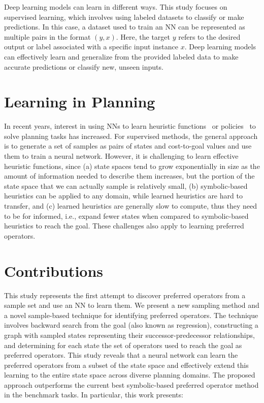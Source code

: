 \documentclass[ppgc,diss,english]{iiufrgs}
\begin{document}
Deep learning models can learn in different ways. This study focuses on supervised learning, which involves using labeled datasets to classify or make predictions. In this case, a dataset used to train an NN can be represented as multiple pairs in the format $(y, x)$. Here, the target $y$ refers to the desired output or label associated with a specific input instance $x$. Deep learning models can effectively learn and generalize from the provided labeled data to make accurate predictions or classify new, unseen inputs.

\section{Learning in Planning}
In recent years, interest in using NNs to learn heuristic functions~\cite{Ferber.etal/2020a,Yu.etal/2020,Shen.etal/2020,Ferber.etal/2022,OToole/2022} or policies~\cite{Toyer.etal/2018,Toyer.etal/2020,Stahlberg.etal/2022} to solve planning tasks has increased. For supervised methods, the general approach is to generate a set of samples as pairs of states and cost-to-goal values and use them to train a neural network. However, it is challenging to learn effective heuristic functions, since (a) state spaces tend to grow exponentially in size as the amount of information needed to describe them increases, but the portion of the state space that we can actually sample is relatively small, (b) symbolic-based heuristics can be applied to any domain, while learned heuristics are hard to transfer, and (c) learned heuristics are generally slow to compute, thus they need to be for informed, i.e., expand fewer states when compared to symbolic-based heuristics to reach the goal. These challenges also apply to learning preferred operators.

\section{Contributions}
This study represents the first attempt to discover preferred operators from a sample set and use an NN to learn them. We present a new sampling method and a novel sample-based technique for identifying preferred operators. The technique involves backward search from the goal (also known as regression), constructing a graph with sampled states representing their successor-predecessor relationships, and determining for each state the set of operators used to reach the goal as preferred operators. This study reveals that a neural network can learn the preferred operators from a subset of the state space and effectively extend this learning to the entire state space across diverse planning domains. The proposed approach outperforms the current best symbolic-based preferred operator method in the benchmark tasks. In particular, this work presents:
\end{document}
